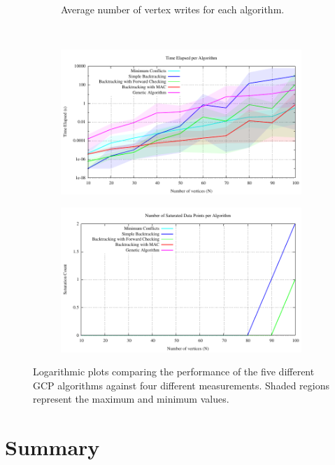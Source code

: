\documentclass{article}
\begin{document}
\begin{figure}
\begin{subfigure}{0.49\textwidth}
				\caption{Average number of vertex writes for each algorithm.}
			\end{subfigure} 
			\\
			\begin{subfigure}{0.49\textwidth}
				\centering
				\includegraphics[width=\textwidth]{../results_5/comparing_time_performance}
			\end{subfigure}
			\;
			\begin{subfigure}{0.49\textwidth}
				\centering
				\includegraphics[width=\textwidth]{../results_5/comparing_num_saturated}
			\end{subfigure}
			\caption{Logarithmic plots comparing the performance of the five different GCP algorithms against four different measurements. Shaded regions represent the maximum and minimum values.}
		\end{figure}
	
	
\section{Summary}

	




	
	
	
\end{document}
